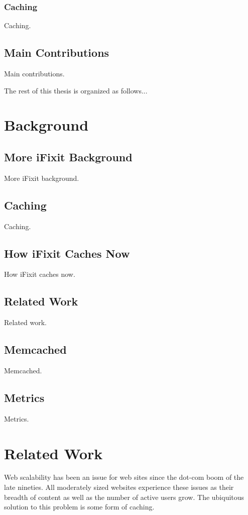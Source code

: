 \documentclass[12pt]{ucthesis}
\begin{document}
\subsection{Caching}
Caching.

\section{Main Contributions}
Main contributions.

The rest of this thesis is organized as follows...


\chapter{Background}
\label{background}

\section{More iFixit Background}
More iFixit background.

\section{Caching}
Caching.

\section{How iFixit Caches Now}
How iFixit caches now.

\section{Related Work}
Related work.

\section{Memcached}
Memcached.

\section{Metrics}
Metrics.

\chapter{Related Work}
\label{relatedWork}

Web scalability has been an issue for web sites since the dot-com boom of the late nineties.
All moderately sized websites experience these issues as their breadth of content as well as the number of active users grow.
The ubiquitous solution to this problem is some form of caching.
\end{document}
